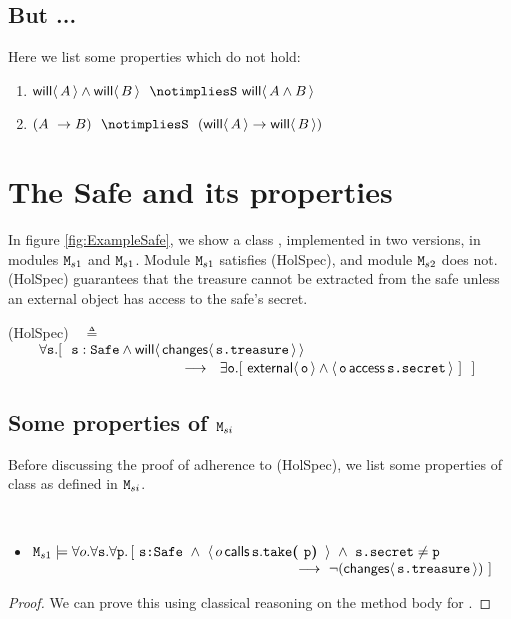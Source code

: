 \documentclass[acmsmall,screen,anonymous,review]{acmart}
\begin{document}
\subsection{But ... }
Here we list some properties which do not hold:
\begin{enumerate}
\item $\Future{A} \wedge \Future{B}\  \ \notimpliesS\ \Future{A\wedge B}$
\item  $(A \ \rightarrow B) \ \ \notimpliesS \ \   (\Future A \rightarrow \Future B)$
\end{enumerate}


\section{The Safe and its properties}

In figure \ref{fig:ExampleSafe}, we show  a class  , implemented in two 
versions, in modules $\M_{s1}$  and  $\M_{s1}$. 
Module  $\M_{s1}$   satisfies (HolSpec), and  module $\M_{s2}$ does not. (HolSpec)
guarantees that the treasure cannot be extracted from the safe
unless  an external object has access to the safe's secret.

\vspace{.1in}
(HolSpec)\ \  $\triangleq$\\ 
$\strut \hspace{.3in}   \forall \prg{s}. %
[\ \ \prg{s}:\prg{Safe} \wedge \Future{ \Changes{\prg{s.treasure}}}  $ \\ 
 $ \strut \hspace{4.3cm}     \longrightarrow \ \  \exists \prg{o}. [\  \External{\prg{o}} \wedge  \CanAccess{\prg{o}}{\prg{s.secret}}\ ]  \  \ ]  $
\vspace{.1in}


\vspace{.2in}

\subsection{Some properties of $\M_{si}$}

Before discussing the proof of adherence to (HolSpec), we list some properties of class  as defined in $\M_{si}$.

\begin{lemma}
\label{lemma:noeffect}
~ ~ ~

\begin{itemize}
\item $\M_{s1} \models \forall o. \forall \prg{s}.\forall \prg{p}.\, [ \ \prg{s:Safe}\ \wedge\ {\Calls {o} {\prg{take}} {\prg{s}} {\prg{p}} }\ \wedge\
 \prg{s.secret}\neq\prg{p}$\\
 $\strut ~\hspace{2.5in}
\ \longrightarrow \ \neg (\Changes {\prg{s.treasure}} )\ ]$
\end{itemize}

\end{lemma}
\begin{proof} We can prove this using classical reasoning on the method body for .
\end{proof}
\end{document}
